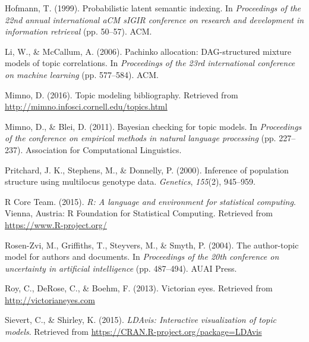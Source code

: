 \documentclass[12pt,]{article}
\begin{document}
\hypertarget{ref-hofmann1999probabilistic}{}
Hofmann, T. (1999). Probabilistic latent semantic indexing. In
\emph{Proceedings of the 22nd annual international aCM sIGIR conference
on research and development in information retrieval} (pp. 50--57). ACM.

\hypertarget{ref-li2006pachinko}{}
Li, W., \& McCallum, A. (2006). Pachinko allocation: DAG-structured
mixture models of topic correlations. In \emph{Proceedings of the 23rd
international conference on machine learning} (pp. 577--584). ACM.

\hypertarget{ref-mimno2016topic}{}
Mimno, D. (2016). Topic modeling bibliography. Retrieved from
\url{http://mimno.infosci.cornell.edu/topics.html}

\hypertarget{ref-mimno2011bayesian}{}
Mimno, D., \& Blei, D. (2011). Bayesian checking for topic models. In
\emph{Proceedings of the conference on empirical methods in natural
language processing} (pp. 227--237). Association for Computational
Linguistics.

\hypertarget{ref-pritchard2000inference}{}
Pritchard, J. K., Stephens, M., \& Donnelly, P. (2000). Inference of
population structure using multilocus genotype data. \emph{Genetics},
\emph{155}(2), 945--959.

\hypertarget{ref-r2015}{}
R Core Team. (2015). \emph{R: A language and environment for statistical
computing}. Vienna, Austria: R Foundation for Statistical Computing.
Retrieved from \url{https://www.R-project.org/}

\hypertarget{ref-rosen2004author}{}
Rosen-Zvi, M., Griffiths, T., Steyvers, M., \& Smyth, P. (2004). The
author-topic model for authors and documents. In \emph{Proceedings of
the 20th conference on uncertainty in artificial intelligence} (pp.
487--494). AUAI Press.

\hypertarget{ref-roy2013victorian}{}
Roy, C., DeRose, C., \& Boehm, F. (2013). Victorian eyes. Retrieved from
\url{http://victorianeyes.com}

\hypertarget{ref-r-LDAvis}{}
Sievert, C., \& Shirley, K. (2015). \emph{LDAvis: Interactive
visualization of topic models}. Retrieved from
\url{https://CRAN.R-project.org/package=LDAvis}
\end{document}
